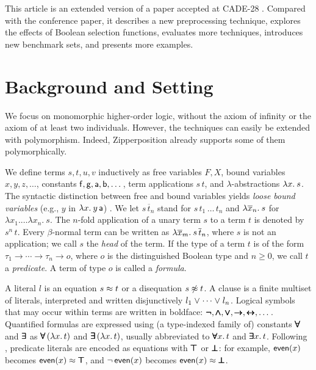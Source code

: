 \documentclass[smallcondensed,draft]{svjour3}     %
\begin{document}
This article is an extended version of a paper accepted at CADE-28
\cite{making-ho-work}. Compared with the conference paper, it
describes a new preprocessing technique, explores the effects of Boolean
selection functions, evaluates %
more techniques,
introduces new benchmark sets, and presents more examples.

\section{Background and Setting}
\label{sec:ho-tech:background}

We focus on monomorphic higher-order logic, without the axiom of infinity 
or the axiom of at least two individuals. However, the techniques can easily be
extended with polymorphism. Indeed, Zipperposition already supports some
of them polymorphically.

We define terms $s, t, u, v$ inductively as free variables $F, X$, bound
variables $x, y, z, \dotsc$, constants $\mathsf{f}, \mathsf{g},\allowbreak
\mathsf{a},\allowbreak \mathsf{b}, \dotsc$, term applications $s \, t$, and
$\lambda$-abstractions $\lambda x.\> s$. The syntactic distinction between free and
bound variables yields \emph{loose bound variables} (e.g., $y$ in $\lambda x.\> y \,
\mathsf{a}$) \cite{tn-93-patterns}.
We let $s \, \overline{t}_n$ stand for $s \, t_1 \, \ldots \, t_n$ and
$\lambda \overline{x}_n.\> s$ for $\lambda x_1. \ldots \lambda x_n. \> s$. The $n$-fold application of
a unary term $s$ to a term $t$ is denoted by $s^n \, t$. Every
$\beta$-normal term can be written as $\lambda \overline{x}_m.\> s \,
\overline{t}_n$, where $s$ is not an application; we call $s$ the \emph{head}
of the term. If the type of a term $t$ is of the form $\tau_1 \to \cdots \to
\tau_n \to o$, where $o$ is the distinguished Boolean type and $n \ge 0$, we
call $t$ a \emph{predicate}. A term of type $o$ is called a \emph{formula}.

A literal $l$ is an equation $s \approx t$ or a disequation $s \not\approx t$. A clause is
a finite multiset of literals, interpreted and written disjunctively $l_1 \mathrel\lor
\cdots \mathrel\lor l_n$. Logical symbols that may occur within terms are written in
boldface: $\pmb{\neg}, \pmb\land, \pmb\lor, \pmb\rightarrow, \pmb\leftrightarrow, \dots$. Quantified
formulas are expressed using (a type-indexed
family of) constants $\pmb\forall$ and $\pmb\exists$ as $\pmb\forall \,
(\lambda x. \, t)$ and $\pmb\exists \, (\lambda x. \, t)$, usually abbreviated to
$\pmb\forall x.\,t$ and $\pmb\exists x.\,t$. Following %
\osup{}, predicate literals are encoded as equations with $\pmb\top$ or
$\pmb\bot$: for example, $\mathsf{even}(x)$ becomes $\mathsf{even}(x) \approx \pmb\top$, and
$\neg\,\mathsf{even}(x)$ becomes $\mathsf{even}(x) \approx \pmb\bot$.
\end{document}
